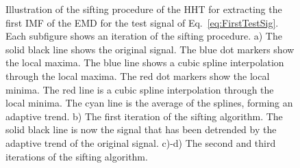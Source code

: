 \documentclass[11pt,draftcls,onecolumn]{IEEEtran}
\begin{document}
\begin{figure}[ht]
	\centering
	\label{fig:HHTDemo}
	\caption{Illustration of the sifting procedure of the HHT for extracting the first IMF of the EMD for the test signal of Eq.~\ref{eq:FirstTestSig}. Each subfigure shows an iteration of the sifting procedure. a) The solid black line shows the original signal. The blue dot markers show the local maxima. The blue line shows a cubic spline interpolation through the local maxima. The red dot markers show the local minima. The red line is a cubic spline interpolation through the local minima. The cyan line is the average of the splines, forming an adaptive trend. b) The first iteration of the sifting algorithm. The solid black line is now the signal that has been detrended by the adaptive trend of the original signal. c)-d) The second and third iterations of the sifting algorithm.}
\end{figure}
\end{document}

